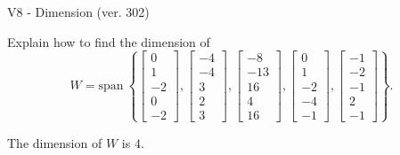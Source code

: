 \begin{exercise}
  \begin{exerciseTitle}V8 - Dimension (ver. 302)\end{exerciseTitle}
  \begin{exerciseStatement}
    Explain how to find the dimension of 
\[W=\mathrm{span}\ \left\{\left[\begin{array}{r}
0 \\
1 \\
-2 \\
0 \\
-2
\end{array}\right] , \left[\begin{array}{r}
-4 \\
-4 \\
3 \\
2 \\
3
\end{array}\right] , \left[\begin{array}{r}
-8 \\
-13 \\
16 \\
4 \\
16
\end{array}\right] , \left[\begin{array}{r}
0 \\
1 \\
-2 \\
-4 \\
-1
\end{array}\right] , \left[\begin{array}{r}
-1 \\
-2 \\
-1 \\
2 \\
-1
\end{array}\right]\right\}.\]



  \end{exerciseStatement}
  \begin{exerciseAnswer}
   The dimension of \(W\) is  \(4\).
  


  \end{exerciseAnswer}
\end{exercise}